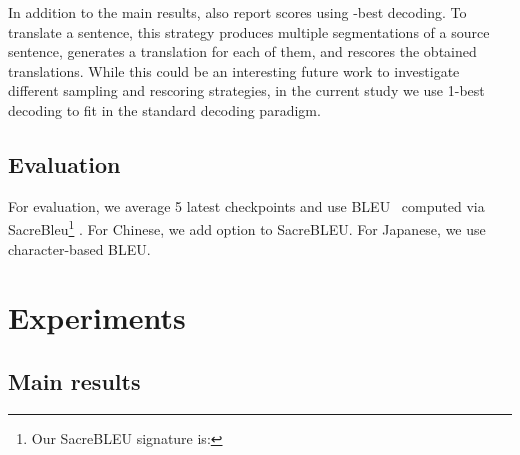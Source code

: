\documentclass[11pt,a4paper]{article}
\begin{document}
In addition to the main results, \citet{sentencepiece} also report scores using -best decoding. To translate a sentence, this strategy produces multiple segmentations of a source sentence, generates a translation for each of them, and rescores the obtained translations. While this could be an interesting future work to investigate different sampling and rescoring strategies, in the current study we use 1-best decoding to fit in the standard decoding paradigm.

\subsection{Evaluation}
For evaluation, we average 5 latest checkpoints and use BLEU~\cite{BLEU} computed via SacreBleu\footnote{Our SacreBLEU signature is:   } \cite{sacrebleu}. For Chinese, we add option  to SacreBLEU. For Japanese, we use character-based BLEU. 





\section{Experiments}\label{sec:experiments}

\subsection{Main results}
\label{sect:main_results}
\end{document}
